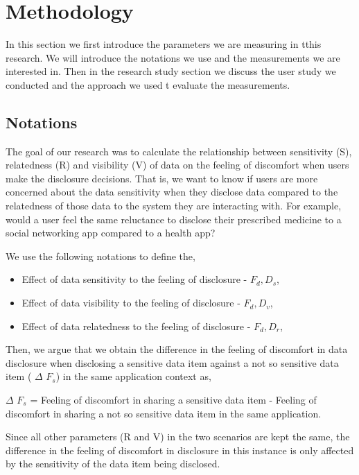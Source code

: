 \documentclass[conference]{IEEEtran}
\begin{document}
\section {Methodology}

In this section we first introduce the parameters we are measuring in tthis research. We will introduce the notations we use and the measurements we are interested in. Then in the research study section we discuss the user study we conducted and the approach we used t evaluate the measurements.

\subsection {Notations}

The goal of our research was to calculate the relationship between sensitivity (S), relatedness (R) and visibility (V) of data on the feeling of discomfort when users make the disclosure decisions. That is, we want to know if users are more concerned about the data sensitivity when they disclose data compared to the relatedness of those data to the system they are interacting with. For example, would a user feel the same reluctance to disclose their prescribed medicine to a social networking app compared to a health app?

We use the following notations to define the,

\begin{itemize}
\item Effect of data sensitivity to the feeling of disclosure -  $F_d,D_s$, 
\item Effect of data visibility to the feeling of disclosure -  $F_d,D_v$, 
\item Effect of data relatedness to the feeling of disclosure -  $F_d,D_r$, 
\end{itemize}

Then, we argue that we obtain the difference in the feeling of discomfort in data disclosure when disclosing a sensitive data item against a not so sensitive data item ( $\Delta$ $F_s$) in the same application context as,

$\Delta$ $F_s$ = Feeling of discomfort in sharing a sensitive data item - Feeling of discomfort in sharing a not so sensitive data item in the same application.

Since all other parameters (R and V) in the two scenarios are kept the same, the difference in the feeling of discomfort in disclosure in this instance is only affected by the sensitivity of the data item being disclosed.
\end{document}
